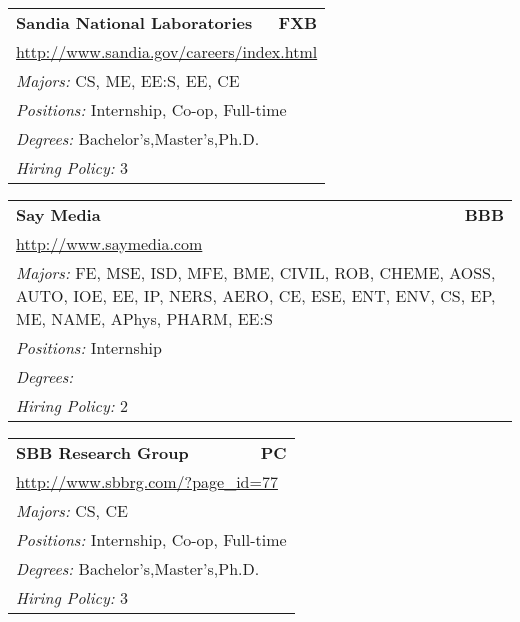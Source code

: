 \documentclass[twoside]{article}
\begin{document}
\begin{center}
\begin{multicols}{3}
\begin{FlushLeft}
\begin{minipage}{\columnwidth}
\end{minipage}
 
\begin{minipage}{\columnwidth}\begin{tabularx}{.95\columnwidth}{Xr}
                 {\Large\bf Sandia National Laboratories} & {\Large\bf FXB}\\
    \multicolumn{2}{p{.95\columnwidth}}{\url{http://www.sandia.gov/careers/index.html}}\\
    \multicolumn{2}{p{.95\columnwidth}}{\emph{Majors:} CS, ME, EE:S, EE, CE}\\
    \multicolumn{2}{p{.95\columnwidth}}{\emph{Positions:} Internship, Co-op, Full-time}\\
    \multicolumn{2}{p{.95\columnwidth}}{\emph{Degrees:} Bachelor's,Master's,Ph.D.}\\
    \multicolumn{2}{p{.95\columnwidth}}{\emph{Hiring Policy:} 3}\\
    \end{tabularx}
    
\end{minipage}
 
\begin{minipage}{\columnwidth}\begin{tabularx}{.95\columnwidth}{Xr}
                 {\Large\bf Say Media} & {\Large\bf BBB}\\
    \multicolumn{2}{p{.95\columnwidth}}{\url{http://www.saymedia.com}}\\
    \multicolumn{2}{p{.95\columnwidth}}{\emph{Majors:} FE, MSE, ISD, MFE, BME, CIVIL, ROB, CHEME, AOSS, AUTO, IOE, EE, IP, NERS, AERO, CE, ESE, ENT, ENV, CS, EP, ME, NAME, APhys, PHARM, EE:S}\\
    \multicolumn{2}{p{.95\columnwidth}}{\emph{Positions:} Internship}\\
    \multicolumn{2}{p{.95\columnwidth}}{\emph{Degrees:} }\\
    \multicolumn{2}{p{.95\columnwidth}}{\emph{Hiring Policy:} 2}\\
    \end{tabularx}
    
\end{minipage}
 
\begin{minipage}{\columnwidth}\begin{tabularx}{.95\columnwidth}{Xr}
                 {\Large\bf SBB Research Group} & {\Large\bf PC}\\
    \multicolumn{2}{p{.95\columnwidth}}{\url{http://www.sbbrg.com/?page_id=77}}\\
    \multicolumn{2}{p{.95\columnwidth}}{\emph{Majors:} CS, CE}\\
    \multicolumn{2}{p{.95\columnwidth}}{\emph{Positions:} Internship, Co-op, Full-time}\\
    \multicolumn{2}{p{.95\columnwidth}}{\emph{Degrees:} Bachelor's,Master's,Ph.D.}\\
    \multicolumn{2}{p{.95\columnwidth}}{\emph{Hiring Policy:} 3}\\
    \end{tabularx}
    

\end{minipage}
\end{FlushLeft}
\end{multicols}
\end{center}
\end{document}
